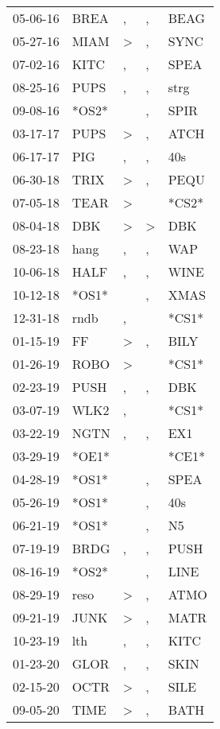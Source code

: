 \begin{supertabular}{lllll}
 05-06-16 &   BREA &             , &             , &   BEAG \\
 05-27-16 &   MIAM &  \textgreater &             , &   SYNC \\
 07-02-16 &   KITC &             , &             , &   SPEA \\
 08-25-16 &   PUPS &             , &             , &   strg \\
 09-08-16 &  *OS2* &               &             , &   SPIR \\
 03-17-17 &   PUPS &  \textgreater &             , &   ATCH \\
 06-17-17 &    PIG &             , &             , &    40s \\
 06-30-18 &   TRIX &  \textgreater &             , &   PEQU \\
 07-05-18 &   TEAR &  \textgreater &               &  *CS2* \\
 08-04-18 &    DBK &  \textgreater &  \textgreater &    DBK \\
 08-23-18 &   hang &             , &             , &    WAP \\
 10-06-18 &   HALF &             , &             , &   WINE \\
 10-12-18 &  *OS1* &               &             , &   XMAS \\
 12-31-18 &   rndb &             , &               &  *CS1* \\
 01-15-19 &     FF &  \textgreater &             , &   BILY \\
 01-26-19 &   ROBO &  \textgreater &               &  *CS1* \\
 02-23-19 &   PUSH &             , &             , &    DBK \\
 03-07-19 &   WLK2 &             , &               &  *CS1* \\
 03-22-19 &   NGTN &             , &             , &    EX1 \\
 03-29-19 &  *OE1* &               &               &  *CE1* \\
 04-28-19 &  *OS1* &               &             , &   SPEA \\
 05-26-19 &  *OS1* &               &             , &    40s \\
 06-21-19 &  *OS1* &               &             , &     N5 \\
 07-19-19 &   BRDG &             , &             , &   PUSH \\
 08-16-19 &  *OS2* &               &             , &   LINE \\
 08-29-19 &   reso &  \textgreater &             , &   ATMO \\
 09-21-19 &   JUNK &  \textgreater &             , &   MATR \\
 10-23-19 &    lth &             , &             , &   KITC \\
 01-23-20 &   GLOR &             , &             , &   SKIN \\
 02-15-20 &   OCTR &  \textgreater &             , &   SILE \\
 09-05-20 &   TIME &  \textgreater &             , &   BATH \\
\end{supertabular}
